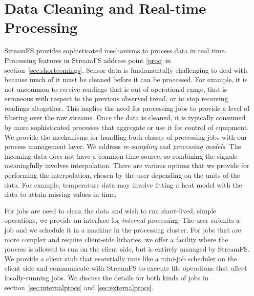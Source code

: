 \section{Data Cleaning and Real-time Processing}

StreamFS provides sophisticated mechanisms to process data in real time.  Processing features in StreamFS address
point \ref{proc} in section~\ref{sec:shortcomings}.
Sensor data is fundamentally challenging to deal with because much of it must be cleaned before it can be processed.  For example,
it is not uncommon to receive readings that is out of operational range, that is erroneous with respect to the previous observed trend,
or to stop receiving readings altogether.  This implies the need for processing jobs to provide a level of filtering over the raw streams.
Once the data is cleaned, it is typically consumed by more sophisticated processes that aggregate or use it for control
of equipment.  We provide the mechanisms for handling both classes of processing jobs with our process management layer.
We address \emph{re-sampling} and \emph{processing models}.  The incoming data does not have a common
time source, so combining the signals meaningfully involves interpolation.  There are various options that we
provide for performing the interpolation, chosen by the user depending on the units of the data.  For example,
temperature data may involve fitting a heat model with the data to attain missing values in time.  

For jobs are need to clean the data and wish to run short-lived, simple operations, we provide an interface for
\emph{internal} processing.  The user submits a job and we schedule it in a machine in the processing cluster.
For jobs that are more complex and require client-side lirbaries, we offer a facility where the process is allowed
to run on the client side, but is entirely managed by StreamFS.  We provide a client stub that essentially runs like a
mini-job scheduler on the client side and communicate with StreamFS to execute file operations that affect locally-running
jobs.  We discuss the details for both kinds of jobs in section~\ref{sec:internalprocs} and \ref{sec:externalprocs}.


